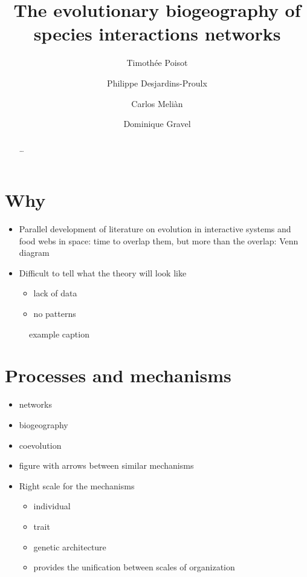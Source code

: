\documentclass[11pt,oneside]{scrartcl}
\title{The evolutionary biogeography of species interactions networks}
\author{Timoth\'ee Poisot \and Philippe Desjardins-Proulx \and Carlos Meli\`an \and Dominique Gravel}
\begin{document}
\maketitle
\begin{abstract}
	\ldots 
\end{abstract}
\doublespacing


\section{Why}

\begin{itemize}

\item Parallel development of literature on evolution in interactive systems and
food webs in space: time to overlap them, but more than the overlap: Venn
diagram

\item Difficult to tell what the theory will look like
	\begin{itemize}
		\item lack of data
		\item no patterns
	\end{itemize}

\end{itemize}

\begin{figure}[htbp]
   \centering
   
   \caption{example caption}
   \label{fig:venn}
\end{figure}

\section{Processes and mechanisms}

\begin{itemize}
	\item networks
	\item biogeography 
	\item coevolution
	\item figure with arrows between similar mechanisms
	\item Right scale for the mechanisms
		\begin{itemize}
			\item individual
			\item trait
			\item genetic architecture
			\item provides the unification between scales of organization
		\end{itemize}
\end{itemize}
\end{document}
